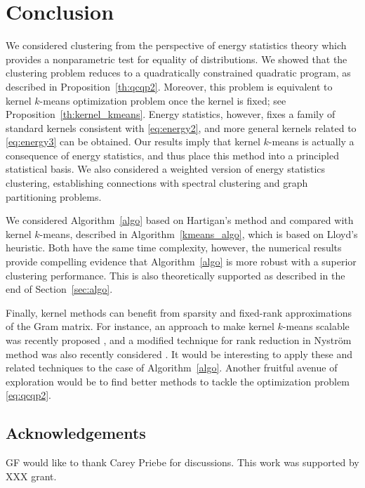 \documentclass[aps,preprint,nofootinbib,floatfix]{revtex4-1}
\begin{document}
\section{Conclusion}
\label{sec:conclusion}

We considered clustering from the perspective of energy
statistics theory which provides a nonparametric test for 
equality of distributions.
We showed that the clustering problem reduces to a quadratically
constrained quadratic program, 
as described in Proposition~\ref{th:qcqp2}.
Moreover, this problem is equivalent
to kernel $k$-means optimization problem once the kernel is fixed; see
Proposition~\ref{th:kernel_kmeans}. Energy statistics, however, fixes
a family of standard kernels consistent with \eqref{eq:energy2}, and
more general kernels related to \eqref{eq:energy3} can be obtained.
Our results imply that kernel $k$-means
is actually a consequence of energy statistics, and thus place this 
method into a principled statistical basis.
We also considered a weighted version of energy statistics clustering,
establishing connections with spectral
clustering and graph partitioning problems.

We considered Algorithm~\ref{algo} based on Hartigan's method and
compared with 
kernel $k$-means, described in Algorithm~\ref{kmeans_algo}, which
is based on Lloyd's heuristic.
Both have the same time complexity, however, the numerical 
results provide compelling evidence that Algorithm~\ref{algo} 
is more robust with
a superior clustering performance. This is also theoretically
supported as described in the end of Section~\ref{sec:algo}.

Finally, kernel methods can benefit from sparsity and
fixed-rank approximations of the Gram matrix.
For instance, an approach to make kernel $k$-means scalable
was recently proposed \cite{Mahoney}, and a modified technique for
rank reduction in Nystr\"om method was also recently considered 
\cite{Becker}. It would be interesting to apply these and related
techniques to the case of Algorithm~\ref{algo}.
Another fruitful avenue of exploration would be to find 
better methods to tackle the optimization problem \eqref{eq:qcqp2}.


\subsection*{Acknowledgements}
GF would like to thank Carey Priebe for discussions.
This work was supported by XXX grant.




\end{document}
